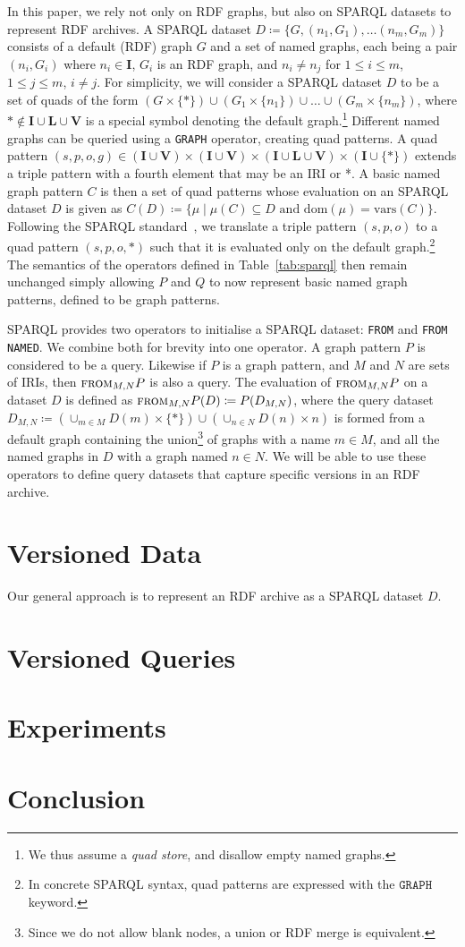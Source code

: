 \documentclass{llncs}
\newcommand{\I}{\ensuremath{\mathbf{I}}\xspace}
\renewcommand{\L}{\ensuremath{\mathbf{L}}\xspace}
\newcommand{\V}{\ensuremath{\mathbf{V}}\xspace}
\newcommand{\sfrom}[3]{\ensuremath{\textsc{from}_{#2,#3}#1}}
\newcommand{\dom}[1]{\ensuremath{\mathrm{dom}(#1)}}
\newcommand{\vars}[1]{\ensuremath{\mathrm{vars}(#1)}}
\begin{document}
In this paper, we rely not only on RDF graphs, but also on SPARQL datasets to represent RDF archives. A SPARQL dataset $D \coloneqq \{ G, (n_1,G_1), \ldots (n_m,G_m) \}$ consists of a default (RDF) graph $G$ and a set of named graphs, each being a pair $(n_i,G_i)$ where $n_i \in \I$, $G_i$ is an RDF graph, and $n_i \neq n_j$ for $1 \leq i \leq m$, $1 \leq j \leq m$, $i \neq j$. For simplicity, we will consider a SPARQL dataset $D$ to be a set of quads of the form $(G \times \{*\}) \cup (G_1 \times \{n_1\}) \cup \ldots \cup (G_m \times \{n_m\})$, where $* \notin \I \cup \L \cup \V$ is a special symbol denoting the default graph.\footnote{We thus assume a \textit{quad store}, and disallow empty named graphs.} Different named graphs can be queried using a \texttt{GRAPH} operator, creating quad patterns. A quad pattern $(s,p,o,g) \in (\I \cup \V) \times (\I \cup \V) \times (\I \cup \L \cup \V) \times (\I \cup \{ *\})$ extends a triple pattern with a fourth element that may be an IRI or *. A basic named graph pattern $C$ is then a set of quad patterns whose evaluation on an SPARQL dataset $D$ is given as $C(D) \coloneqq \{ \mu \mid \mu(C) \subseteq D\text{ and }\dom{\mu} = \vars{C} \}$. Following the SPARQL standard~\cite{sparql11}, we translate a triple pattern $(s,p,o)$ to a quad pattern $(s,p,o,*)$ such that it is evaluated only on the default graph.\footnote{In concrete SPARQL syntax, quad patterns are expressed with the $\texttt{GRAPH}$ keyword.} The semantics of the operators defined in Table~\ref{tab:sparql} then remain unchanged simply allowing $P$ and $Q$ to now represent basic named graph patterns, defined to be graph patterns.

SPARQL provides two operators to initialise a SPARQL dataset: \texttt{FROM} and \texttt{FROM NAMED}. We combine both for brevity into one operator. A graph pattern $P$ is considered to be a query. Likewise if $P$ is a graph pattern, and $M$ and $N$ are sets of IRIs, then $\sfrom{P}{M}{N}$ is also a query. The evaluation of $\sfrom{P}{M}{N}$ on a dataset $D$ is defined as $\sfrom{P}{M}{N}(D) \coloneqq P(D_{M,N})$, where the query dataset $D_{M,N} \coloneqq (\cup_{m \in M} D(m) \times \{ *\}) \cup  (\cup_{n \in N} D(n) \times n)$ is formed from a default graph containing the union\footnote{Since we do not allow blank nodes, a union or RDF merge is equivalent.} of graphs with a name $m \in M$, and all the named graphs in $D$ with a graph named $n \in N$. We will be able to use these operators to define query datasets that capture specific versions in an RDF archive.

\section{Versioned Data}

Our general approach is to represent an RDF archive as a SPARQL dataset $D$.

\section{Versioned Queries}

\section{Experiments} 

\section{Conclusion}
\newpage


\end{document}
